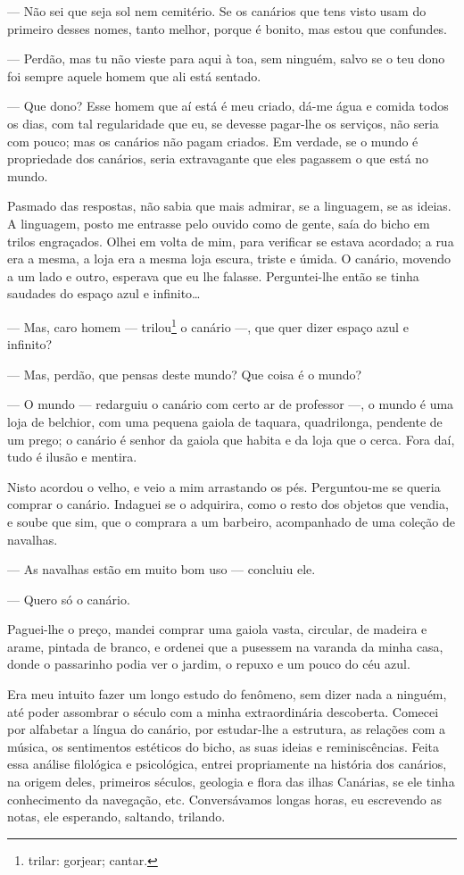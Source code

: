 --- Não sei que seja sol nem cemitério. Se os canários que tens visto
usam do primeiro desses nomes, tanto melhor, porque é bonito, mas estou
que confundes.

--- Perdão, mas tu não vieste para aqui à toa, sem ninguém, salvo se o
teu dono foi sempre aquele homem que ali está sentado.

--- Que dono? Esse homem que aí está é meu criado, dá-me água e comida
todos os dias, com tal regularidade que eu, se devesse pagar-lhe os
serviços, não seria com pouco; mas os canários não pagam criados. Em
verdade, se o mundo é propriedade dos canários, seria extravagante que
eles pagassem o que está no mundo.

Pasmado das respostas, não sabia que mais admirar, se a linguagem, se as
ideias. A linguagem, posto me entrasse pelo ouvido como de gente, saía
do bicho em trilos engraçados. Olhei em volta de mim, para verificar se
estava acordado; a rua era a mesma, a loja era a mesma loja escura,
triste e úmida. O canário, movendo a um lado e outro, esperava que eu
lhe falasse. Perguntei-lhe então se tinha saudades do espaço azul e
infinito\ldots{}

--- Mas, caro homem --- trilou\footnote{trilar: gorjear; cantar.} o
canário ---, que quer dizer espaço azul e infinito?

--- Mas, perdão, que pensas deste mundo? Que coisa é o mundo?

--- O mundo --- redarguiu o canário com certo ar de professor ---, o
mundo é uma loja de belchior, com uma pequena gaiola de taquara,
quadrilonga, pendente de um prego; o canário é senhor da gaiola que
habita e da loja que o cerca. Fora daí, tudo é ilusão e mentira.

Nisto acordou o velho, e veio a mim arrastando os pés. Perguntou-me se
queria comprar o canário. Indaguei se o adquirira, como o resto dos
objetos que vendia, e soube que sim, que o comprara a um barbeiro,
acompanhado de uma coleção de navalhas.

--- As navalhas estão em muito bom uso --- concluiu ele.

--- Quero só o canário.

Paguei-lhe o preço, mandei comprar uma gaiola vasta, circular, de
madeira e arame, pintada de branco, e ordenei que a pusessem na varanda
da minha casa, donde o passarinho podia ver o jardim, o repuxo e um
pouco do céu azul.

Era meu intuito fazer um longo estudo do fenômeno, sem dizer nada a
ninguém, até poder assombrar o século com a minha extraordinária
descoberta. Comecei por alfabetar a língua do canário, por estudar-lhe a
estrutura, as relações com a música, os sentimentos estéticos do bicho,
as suas ideias e reminiscências. Feita essa análise filológica e
psicológica, entrei propriamente na história dos canários, na origem
deles, primeiros séculos, geologia e flora das ilhas Canárias, se ele
tinha conhecimento da navegação, etc. Conversávamos longas horas, eu
escrevendo as notas, ele esperando, saltando, trilando.

